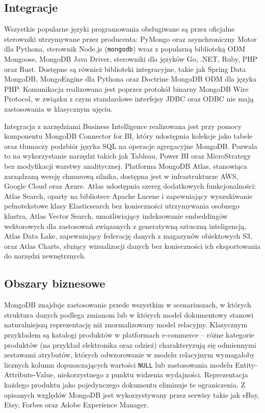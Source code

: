 \subsection{Integracje}

Wszystkie popularne języki programowania obsługiwane są przez oficjalne
sterowniki utrzymywane przez producenta: PyMongo oraz asynchroniczny Motor
dla Pythona, sterownik Node.js (\texttt{mongodb}) wraz z popularną biblioteką
ODM Mongoose, MongoDB Java Driver, sterowniki dla języków Go, .NET, Ruby,
PHP oraz Rust. Dostępne są również biblioteki integracyjne, takie jak
Spring Data MongoDB, MongoEngine dla Pythona oraz Doctrine MongoDB ODM dla
języka PHP. Komunikacja realizowana jest poprzez protokół binarny MongoDB
Wire Protocol, w związku z czym standardowe interfejsy JDBC oraz ODBC nie
mają zastosowania w klasycznym ujęciu.

Integracja z narzędziami Business Intelligence realizowana jest przy pomocy
komponentu MongoDB Connector for BI, który udostępnia kolekcje jako tabele
oraz tłumaczy podzbiór języka SQL na operacje agregacyjne MongoDB. Pozwala
to na wykorzystanie narzędzi takich jak Tableau, Power BI oraz MicroStrategy
bez modyfikacji warstwy analitycznej. Platforma MongoDB Atlas, stanowiąca
zarządzaną wersję chmurową silnika, dostępna jest w infrastrukturze AWS,
Google Cloud oraz Azure. Atlas udostępnia szereg dodatkowych funkcjonalności:
Atlas Search, oparty na bibliotece Apache Lucene i zapewniający wyszukiwanie
pełnotekstowe klasy Elasticsearch bez konieczności utrzymywania osobnego
klastra, Atlas Vector Search, umożliwiający indeksowanie embeddingów
wektorowych dla zastosowań związanych z generatywną sztuczną inteligencją,
Atlas Data Lake, zapewniający federację danych z magazynów obiektowych S3,
oraz Atlas Charts, służący wizualizacji danych bez konieczności ich
eksportowania do narzędzi zewnętrznych.

\subsection{Obszary biznesowe}

MongoDB znajduje zastosowanie przede wszystkim w scenariuszach, w których
struktura danych podlega zmianom lub w których model dokumentowy stanowi
naturalniejszą reprezentację niż znormalizowany model relacyjny. Klasycznym
przykładem są katalogi produktów w platformach e-commerce -- różne kategorie
produktów (na przykład elektronika oraz odzież) charakteryzują się odmiennymi
zestawami atrybutów, których odwzorowanie w modelu relacyjnym wymagałoby
licznych kolumn dopuszczających wartości \texttt{NULL} lub zastosowania
modelu Entity-Attribute-Value, niekorzystnego z punktu widzenia wydajności.
Reprezentacja każdego produktu jako pojedynczego dokumentu eliminuje te
ograniczenia. Z opisanych względów MongoDB jest wykorzystywany przez
serwisy takie jak eBay, Etsy, Forbes oraz Adobe Experience Manager.

